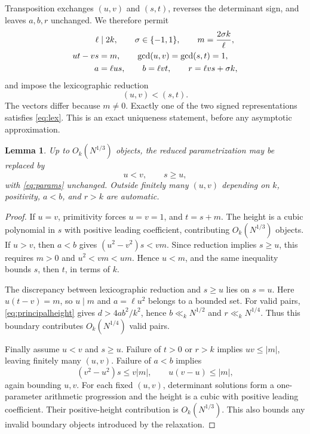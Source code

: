 \documentclass[11pt,a4paper]{article}
\numberwithin{equation}{section}
\newtheorem{lemma}[theorem]{Lemma}
\theoremstyle{remark}
\begin{document}
Transposition exchanges $(u,v)$ and $(s,t)$, reverses the determinant sign, and leaves $a,b,r$ unchanged. We therefore permit
\begin{align}
\ell&\mid2k,\qquad \sigma\in\{-1,1\},\qquad m=\frac{2\sigma k}{\ell},\notag\\
ut-vs&=m,\qquad \gcd(u,v)=\gcd(s,t)=1,\label{eq:params}\\
a&=\ell us,\qquad b=\ell vt,\qquad r=\ell vs+\sigma k,\notag
\end{align}
and impose the lexicographic reduction
\begin{equation}\label{eq:lex}
(u,v)<(s,t).
\end{equation}
The vectors differ because $m\ne0$. Exactly one of the two signed representations satisfies \eqref{eq:lex}. This is an exact uniqueness statement, before any asymptotic approximation.

\begin{lemma}\label{lem:boundary}
Up to $O_k(N^{1/3})$ objects, the reduced parametrization may be replaced by
\begin{equation}\label{eq:relaxed}
u<v,\qquad s\ge u,
\end{equation}
with \eqref{eq:params} unchanged. Outside finitely many $(u,v)$ depending on $k$, positivity, $a<b$, and $r>k$ are automatic.
\end{lemma}
\begin{proof}
If $u=v$, primitivity forces $u=v=1$, and $t=s+m$. The height is a cubic polynomial in $s$ with positive leading coefficient, contributing $O_k(N^{1/3})$ objects.
If $u>v$, then $a<b$ gives $(u^2-v^2)s<vm$. Since reduction implies $s\ge u$, this requires $m>0$ and $u^2<vm<um$. Hence $u<m$, and the same inequality bounds $s$, then $t$, in terms of $k$.

The discrepancy between lexicographic reduction and $s\ge u$ lies on $s=u$. Here $u(t-v)=m$, so $u\mid m$ and $a=\ell u^2$ belongs to a bounded set. For valid pairs, \eqref{eq:principalheight} gives $d>4ab^2/k^2$, hence $b\ll_k N^{1/2}$ and $r\ll_k N^{1/4}$. Thus this boundary contributes $O_k(N^{1/4})$ valid pairs.

Finally assume $u<v$ and $s\ge u$. Failure of $t>0$ or $r>k$ implies $uv\le|m|$, leaving finitely many $(u,v)$. Failure of $a<b$ implies
\[
(v^2-u^2)s\le v|m|,\qquad u(v-u)\le|m|,
\]
again bounding $u,v$. For each fixed $(u,v)$, determinant solutions form a one-parameter arithmetic progression and the height is a cubic with positive leading coefficient. Their positive-height contribution is $O_k(N^{1/3})$. This also bounds any invalid boundary objects introduced by the relaxation.
\end{proof}
\end{document}
